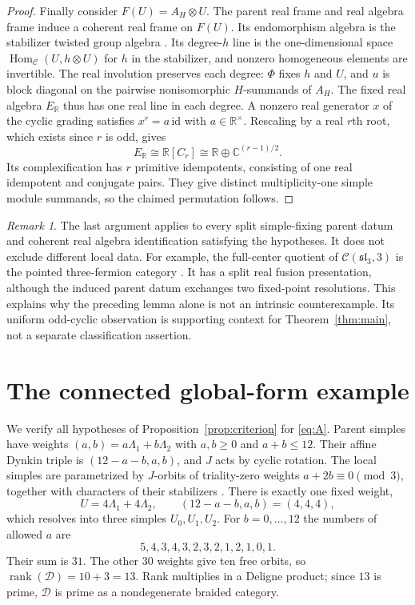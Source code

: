 \documentclass[11pt]{amsart}
\theoremstyle{remark}
\newtheorem{remark}[theorem]{Remark}
\newcommand{\C}{\mathbb C}
\newcommand{\R}{\mathbb R}
\newcommand{\D}{\mathcal D}
\newcommand{\Hom}{\operatorname{Hom}}
\newcommand{\slthree}{\mathfrak{sl}_3}
\begin{document}
\begin{proof}
Finally consider $F(U)=A_H\otimes U$. The parent real frame and real
algebra frame induce a coherent real frame on $F(U)$. Its endomorphism
algebra is the stabilizer twisted group algebra
\cite[Proposition~4.7]{FRS}. Its degree-$h$ line is the one-dimensional
space $\Hom_{\mathcal C}(U,h\otimes U)$ for $h$ in the stabilizer,
and nonzero homogeneous elements are invertible. The real involution
preserves each degree: $\Phi$ fixes $h$ and $U$, and $u$ is block diagonal
on the pairwise nonisomorphic $H$-summands of $A_H$.
The fixed real algebra $E_\R$ thus has one real line in each degree.
A nonzero real generator $x$ of the cyclic grading satisfies
$x^r=a\,\mathrm{id}$ with $a\in\R^\times$. Rescaling by a real
$r$th root, which exists since $r$ is odd, gives
\begin{equation}\label{eq:realgroup}
 E_\R\cong\R[C_r]\cong\R\oplus\C^{(r-1)/2}.
\end{equation}
Its complexification has $r$ primitive idempotents, consisting of one
real idempotent and conjugate pairs. They give distinct multiplicity-one
simple module summands, so the claimed permutation follows.
\end{proof}

\begin{remark}
The last argument applies to every split simple-fixing parent datum and
coherent real algebra identification satisfying the hypotheses. It does
not exclude different local data. For example, the full-center quotient
of $\mathcal C(\slthree,3)$ is the pointed three-fermion category
\cite[Lemma~2.15]{Edie}. It has a split real fusion presentation,
although the induced parent datum exchanges two fixed-point resolutions.
This explains why the preceding lemma alone is not an intrinsic
counterexample. Its uniform odd-cyclic observation is supporting context
for Theorem~\ref{thm:main}, not a separate classification assertion.
\end{remark}

\section{The connected global-form example}\label{sec:example}

We verify all hypotheses of Proposition~\ref{prop:criterion} for
\eqref{eq:A}. Parent simples have weights $(a,b)=a\Lambda_1+b\Lambda_2$
with $a,b\ge0$ and $a+b\le12$. Their affine Dynkin triple is
$(12-a-b,a,b)$, and $J$ acts by cyclic rotation. The local simples are
parametrized by $J$-orbits of triality-zero weights
$a+2b\equiv0\pmod3$, together with characters of their stabilizers
\cite[Lemmas~2.12--2.13]{Edie}. There is exactly one fixed weight,
\[
 U=4\Lambda_1+4\Lambda_2,\qquad (12-a-b,a,b)=(4,4,4),
\]
which resolves into three simples $U_0,U_1,U_2$.
For $b=0,\ldots,12$ the numbers of allowed $a$ are
\[
 5,4,3,4,3,2,3,2,1,2,1,0,1.
\]
Their sum is $31$. The other $30$ weights give ten free orbits, so
$\operatorname{rank}(\D)=10+3=13$. Rank multiplies in a Deligne
product; since $13$ is prime, $\D$ is prime as a nondegenerate braided
category.
\end{document}
